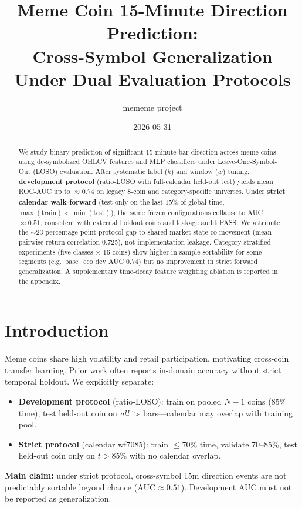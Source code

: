 \documentclass[11pt,a4paper]{article}
\title{Meme Coin 15-Minute Direction Prediction:\\
Cross-Symbol Generalization Under Dual Evaluation Protocols}
\author{mememe project}
\date{2026-05-31}
\begin{document}
\maketitle

\begin{abstract}
We study binary prediction of significant 15-minute bar direction across meme coins using
de-symbolized OHLCV features and MLP classifiers under Leave-One-Symbol-Out (LOSO) evaluation.
After systematic label ($k$) and window ($w$) tuning, \textbf{development protocol} (ratio-LOSO with
full-calendar held-out test) yields mean ROC-AUC up to $\approx 0.74$ on legacy 8-coin and
category-specific universes. Under \textbf{strict calendar walk-forward} (test only on the last
15\% of global time, $\max(\text{train}) < \min(\text{test})$), the same frozen configurations
collapse to AUC $\approx 0.51$, consistent with external holdout coins and leakage audit PASS.
We attribute the $\sim$23 percentage-point protocol gap to shared market-state co-movement
(mean pairwise return correlation 0.725), not implementation leakage. Category-stratified
experiments (five classes $\times$ 16 coins) show higher in-sample sortability for some segments
(e.g.\ base\_eco dev AUC 0.74) but no improvement in strict forward generalization.
A supplementary time-decay feature weighting ablation is reported in the appendix.
\end{abstract}

\section{Introduction}
Meme coins share high volatility and retail participation, motivating cross-coin transfer learning.
Prior work often reports in-domain accuracy without strict temporal holdout. We explicitly separate:
\begin{itemize}
  \item \textbf{Development protocol} (ratio-LOSO): train on pooled $N{-}1$ coins (85\% time),
        test held-out coin on \emph{all} its bars---calendar may overlap with training pool.
  \item \textbf{Strict protocol} (calendar wf7085): train $\le 70\%$ time, validate 70--85\%,
        test held-out coin only on $t > 85\%$ with no calendar overlap.
\end{itemize}
\textbf{Main claim:} under strict protocol, cross-symbol 15m direction events are not predictably
sortable beyond chance ($\text{AUC} \approx 0.51$). Development AUC must not be reported as
generalization.
\end{document}
